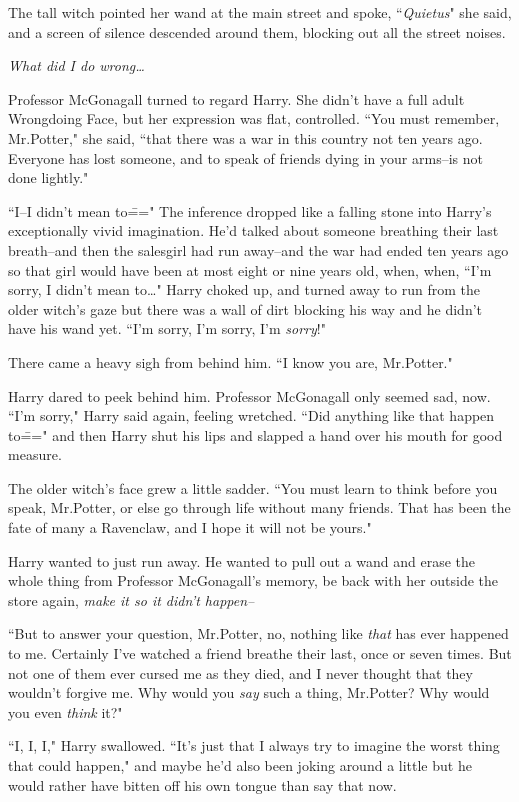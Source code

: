 The tall witch pointed her wand at the main street and spoke, ``\emph{Quietus}" she said, and a screen of silence descended around them, blocking out all the street noises.

\emph{What did I do wrong{\ldots}}

Professor McGonagall turned to regard Harry. She didn't have a full adult Wrongdoing Face, but her expression was flat, controlled. ``You must remember, Mr.\?Potter," she said, ``that there was a war in this country not ten years ago. Everyone has lost someone, and to speak of friends dying in your arms\---is not done lightly."

``I\---I didn't mean to\===" The inference dropped like a falling stone into Harry's exceptionally vivid imagination. He'd talked about someone breathing their last breath\---and then the salesgirl had run away\---and the war had ended ten years ago so that girl would have been at most eight or nine years old, when, when, ``I'm sorry, I didn't mean to{\ldots}" Harry choked up, and turned away to run from the older witch's gaze but there was a wall of dirt blocking his way and he didn't have his wand yet. ``I'm sorry, I'm sorry, I'm \emph{sorry}!"

There came a heavy sigh from behind him. ``I know you are, Mr.\?Potter."

Harry dared to peek behind him. Professor McGonagall only seemed sad, now. ``I'm sorry," Harry said again, feeling wretched. ``Did anything like that happen to\===" and then Harry shut his lips and slapped a hand over his mouth for good measure.

The older witch's face grew a little sadder. ``You must learn to think before you speak, Mr.\?Potter, or else go through life without many friends. That has been the fate of many a Ravenclaw, and I hope it will not be yours."

Harry wanted to just run away. He wanted to pull out a wand and erase the whole thing from Professor McGonagall's memory, be back with her outside the store again, \emph{make it so it didn't happen\---}

``But to answer your question, Mr.\?Potter, no, nothing like \emph{that} has ever happened to me. Certainly I've watched a friend breathe their last, once or seven times. But not one of them ever cursed me as they died, and I never thought that they wouldn't forgive me. Why would you \emph{say} such a thing, Mr.\?Potter? Why would you even \emph{think} it?"

``I, I, I," Harry swallowed. ``It's just that I always try to imagine the worst thing that could happen," and maybe he'd also been joking around a little but he would rather have bitten off his own tongue than say that now.

